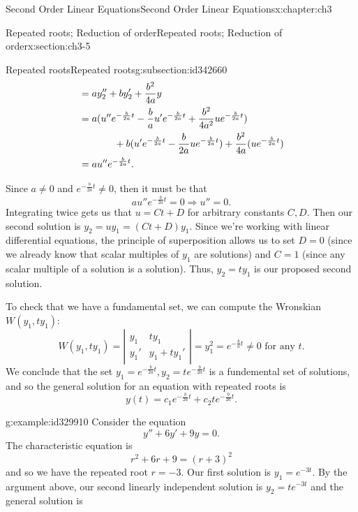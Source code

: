 \documentclass[oneside,10pt,]{book}
\numberwithin{equation}{section}
\numberwithin{equation}{section}
\newcommand{\amp}{&}
\begin{document}
\begin{chapterptx}{Second Order Linear Equations}{}{Second Order Linear Equations}{}{}{x:chapter:ch3}
\begin{sectionptx}{Repeated roots; Reduction of order}{}{Repeated roots; Reduction of order}{}{}{x:section:ch3-5}
\begin{subsectionptx}{Repeated roots}{}{Repeated roots}{}{}{g:subsection:id342660}
\begin{align*}
\amp= ay_2'' + by_2' + \frac{b^2}{4a}y\\
\amp= a(u'' e^{-\frac{b}{2a} t} - \frac{b}{a} u' e^{-\frac{b}{2a}t} + \frac{b^2}{4a^2} u e^{-\frac{b}{2a}t})\\
\amp\hspace{.5in} + b(u' e^{-\frac{b}{2a}t} -\frac{b}{2a} u e^{-\frac{b}{2a}t}) + \frac{b^2}{4a}(u e^{-\frac{b}{2a}t})\\
\amp = a u'' e^{-\frac{b}{2a}t}.
\end{align*}
%
\par
Since \(a \neq 0\) and \(e^{-\frac{b}{2a}t} \neq 0\), then it must be that%
\begin{equation*}
a u'' e^{-\frac{b}{2a} t} = 0 \Rightarrow u'' = 0.
\end{equation*}
Integrating twice gets us that \(u = Ct + D\) for arbitrary constants \(C, D\). Then our second solution is \(y_2 = u y_1 = (Ct + D)y_1\). Since we're working with linear differential equations, the principle of superposition allows us to set \(D = 0\) (since we already know that scalar multiples of \(y_1\) are solutions) and \(C = 1\) (since any scalar multiple of a solution is a solution). Thus, \(y_2 = t y_1\) is our proposed second solution.%
\par
To check that we have a fundamental set, we can compute the Wronskian \(W(y_1, t y_1)\):%
\begin{equation*}
W(y_1, t y_1) = \left| \begin{array}{cc} y_1 \amp t y_1 \\
y_1' \amp y_1 + t y_1' \end{array}\right| = y_1^2 = e^{-\frac{b}{a}t} \neq 0 \text{ for any } t.
\end{equation*}
We conclude that the set \(y_1 = e^{-\frac{b}{2a}t}, y_2 = t e^{-\frac{b}{2a}t}\) is a fundemental set of solutions, and so the general solution for an equation with repeated roots is%
\begin{equation*}
y(t) = c_1 e^{-\frac{b}{2a}t} + c_2t e^{-\frac{b}{2a}t}.
\end{equation*}
%
\begin{example}{}{g:example:id329910}%
Consider the equation%
\begin{equation*}
y'' + 6y' + 9y = 0.
\end{equation*}
The characteristic equation is%
\begin{equation*}
r^2 + 6r + 9 = (r + 3)^2
\end{equation*}
and so we have the repeated root \(r = -3\). Our first solution is \(y_1 = e^{-3t}\). By the argument above, our second linearly independent solution is \(y_2 = t e^{-3t}\) and the general solution is%

\end{example}
\end{subsectionptx}
\end{sectionptx}
\end{chapterptx}
\end{document}
